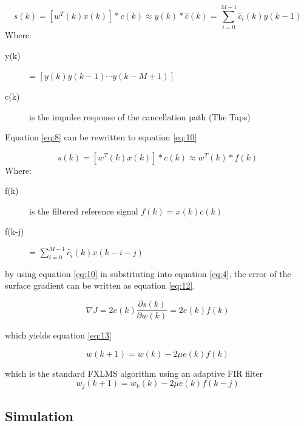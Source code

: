 \begin{equation}\label{eq:8}
s(k) = [w^T(k)x(k)]*c(k)\approx y(k)*\hat{c}(k) = \sum_{i=0}^{M-1}\hat{c}_i(k)y(k-1)
\end{equation}
Where:
\begin{description}
	\item[y(k)] = $[ y(k) y(k-1) \cdots y(k-M+1)]$
	\item[c(k)] is the impulse response of the cancellation path (The Taps)
\end{description}

Equation \ref{eq:8} can be rewritten to equation \ref{eq:10}

\begin{equation}\label{eq:10}
s(k) = [w^T(k)x(k)]*c(k)\approx w^T(k)*f(k)
\end{equation}
Where:
\begin{description}
	\item[f(k)] is the filtered reference signal $f(k)=x(k)c(k)$
	\item[f(k-j)] = $\sum_{i=0}^{M-1}\hat{c}_i(k)x(k-i-j)$
\end{description}

by using equation \ref{eq:10} in substituting into equation \ref{eq:4}, the error of the surface gradient can be written as equation \ref{eq:12}.

\begin{equation}\label{eq:12}
\nabla J = 2e(k)\frac{\partial s(k)}{\partial w(k)} = 2e(k)f(k)
\end{equation}

which yields equation \ref{eq:13}

\begin{equation}\label{eq:13}
w(k+1) = w(k) - 2\mu e(k)f(k)
\end{equation}

which is the standard FXLMS algorithm using an adaptive FIR filter
\begin{equation}\label{eq:14}
w_j(k+1) = w_k(k) - 2\mu e(k)f(k-j)
\end{equation}


\subsection*{Simulation} 